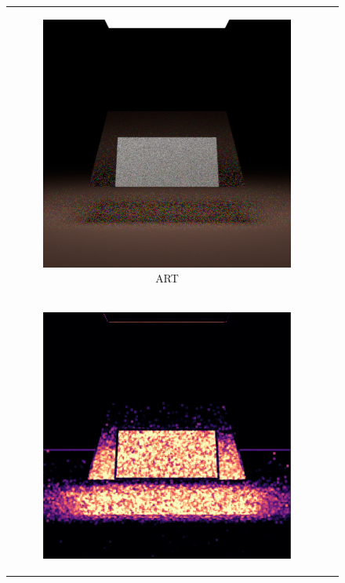 \begin{figure}[h]
\begin{tabular}{cc}
\begin{subfigure}
			{0.4\textwidth}\centering\includegraphics[width=\linewidth]{img/polarizing_plane_90_ART.png}
			\caption{ART}
		\end{subfigure} \\
		\begin{subfigure}
			{0.4\textwidth}\centering\includegraphics[width=\linewidth]{img/polarizing_plane_90_SSIM.png}

\end{subfigure}
\end{tabular}
\end{figure}
